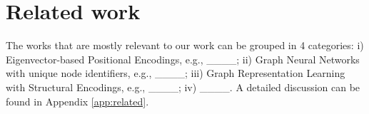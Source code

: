 \section{Related work}
The works that are mostly relevant to our work can be grouped in 4 categories: i) Eigenvector-based Positional Encodings, e.g., ____; ii) Graph Neural Networks with unique node identifiers, e.g., ____; iii) Graph Representation Learning with Structural Encodings, e.g., ____; iv) ____. A detailed discussion can be found in Appendix \ref{app:related}.